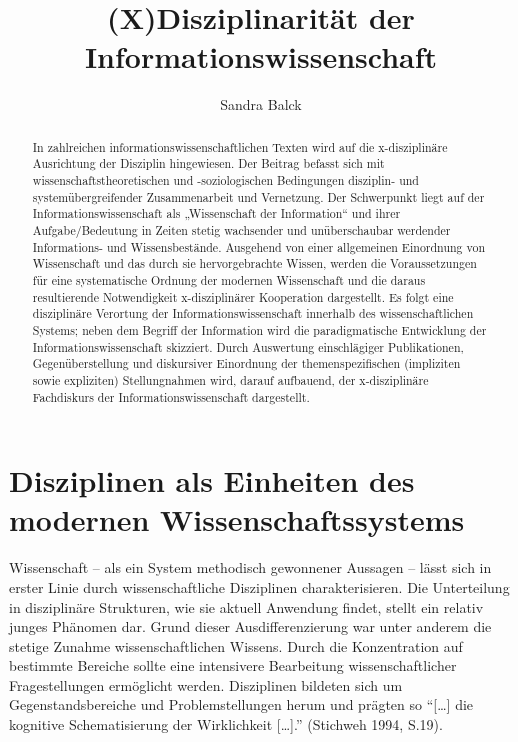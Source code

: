 \documentclass[a4paper,
fontsize=11pt,
oneside,
numbers=noperiodatend,
parskip=half-,
bibliography=totoc,
final
]{scrartcl}
\title{\LARGE{(X)Disziplinarität der Informationswissenschaft}} %
\author{Sandra Balck} %
\date{}
\begin{document}
\maketitle
\thispagestyle{fancyplain} 

\begin{abstract}
In zahlreichen informationswissenschaftlichen Texten wird auf die
x-disziplinäre Ausrichtung der Disziplin hingewiesen. Der Beitrag
befasst sich mit wissenschaftstheoretischen und -soziologischen
Bedingungen disziplin- und systemübergreifender Zusammenarbeit und
Vernetzung. Der Schwerpunkt liegt auf der Informationswissenschaft als
„Wissenschaft der Information`` und ihrer Aufgabe/Bedeutung in Zeiten
stetig wachsender und unüberschaubar werdender Informations- und
Wissensbestände. Ausgehend von einer allgemeinen Einordnung von
Wissenschaft und das durch sie hervorgebrachte Wissen, werden die
Voraussetzungen für eine systematische Ordnung der modernen Wissenschaft
und die daraus resultierende Notwendigkeit x-disziplinärer Kooperation
dargestellt. Es folgt eine disziplinäre Verortung der
Informationswissenschaft innerhalb des wissenschaftlichen Systems; neben
dem Begriff der Information wird die paradigmatische Entwicklung der
Informationswissenschaft skizziert. Durch Auswertung einschlägiger
Publikationen, Gegenüberstellung und diskursiver Einordnung der
themenspezifischen (impliziten sowie expliziten) Stellungnahmen wird,
darauf aufbauend, der x-disziplinäre Fachdiskurs der
Informationswissenschaft dargestellt.
\end{abstract}

\section*{Disziplinen als Einheiten des modernen
Wissenschaftssystems}\label{disziplinen-als-einheiten-des-modernen-wissenschaftssystems}

Wissenschaft -- als ein System methodisch gewonnener Aussagen -- lässt
sich in erster Linie durch wissenschaftliche Disziplinen
charakterisieren. Die Unterteilung in disziplinäre Strukturen, wie sie
aktuell Anwendung findet, stellt ein relativ junges Phänomen dar. Grund
dieser Ausdifferenzierung war unter anderem die stetige Zunahme
wissenschaftlichen Wissens. Durch die Konzentration auf bestimmte
Bereiche sollte eine intensivere Bearbeitung wissenschaftlicher
Fragestellungen ermöglicht werden. Disziplinen bildeten sich um
Gegenstandsbereiche und Problemstellungen herum und prägten so
\enquote{{[}\ldots{}{]} die kognitive Schematisierung der Wirklichkeit
{[}\ldots{}{]}.} (Stichweh 1994, S.19).
\end{document}
